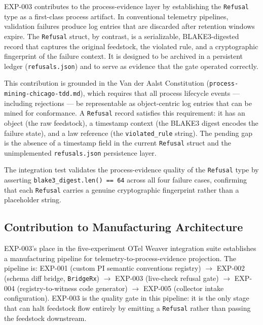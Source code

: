 EXP-003 contributes to the process-evidence layer by establishing the \texttt{Refusal}
type as a first-class process artifact. In conventional telemetry pipelines, validation
failures produce log entries that are discarded after retention windows expire.
The \texttt{Refusal} struct, by contrast, is a serializable, BLAKE3-digested record
that captures the original feedstock, the violated rule, and a cryptographic fingerprint
of the failure context. It is designed to be archived in a persistent ledger
(\texttt{refusals.json}) and to serve as evidence that the gate operated correctly.

This contribution is grounded in the Van der Aalst Constitution
(\texttt{process-mining-chicago-tdd.md}), which requires that all process lifecycle
events --- including rejections --- be representable as object-centric log entries
that can be mined for conformance. A \texttt{Refusal} record satisfies this requirement:
it has an object (the raw feedstock), a timestamp context (the BLAKE3 digest encodes
the failure state), and a law reference (the \texttt{violated\_rule} string). The
pending gap is the absence of a timestamp field in the current \texttt{Refusal} struct
and the unimplemented \texttt{refusals.json} persistence layer.

The integration test validates the process-evidence quality of the \texttt{Refusal}
type by asserting \texttt{blake3\_digest.len() == 64} across all four failure cases,
confirming that each \texttt{Refusal} carries a genuine cryptographic fingerprint
rather than a placeholder string.

\subsection{Contribution to Manufacturing Architecture}
\label{sec:otel-weaver-exp-003-live-check-to-refusal-contribution-manufacturing}

EXP-003's place in the five-experiment OTel Weaver integration suite establishes a
manufacturing pipeline for telemetry-to-process-evidence projection. The pipeline
is: EXP-001 (custom PI semantic conventions registry) $\rightarrow$ EXP-002 (schema
diff bridge, \texttt{BridgeRx}) $\rightarrow$ EXP-003 (live-check refusal gate)
$\rightarrow$ EXP-004 (registry-to-witness code generator) $\rightarrow$ EXP-005
(collector intake configuration). EXP-003 is the quality gate in this pipeline:
it is the only stage that can halt feedstock flow entirely by emitting a
\texttt{Refusal} rather than passing the feedstock downstream.

